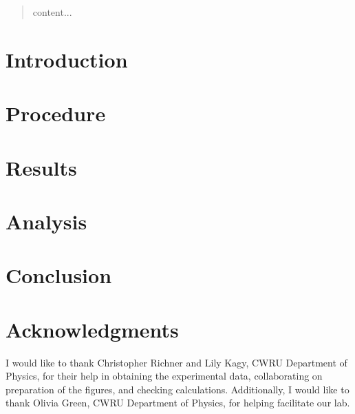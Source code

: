 \documentclass[coverpage]{article}
\begin{document}
	
	
	\begin{abstract}
		content...
	\end{abstract}
	
	\tableofcontents
	
	\section{Introduction}
	
	\section{Procedure}
	
	\section{Results}
	
	\section{Analysis}
	
	\section{Conclusion}
	
	\section*{Acknowledgments}
	I would like to thank Christopher Richner and Lily Kagy, CWRU Department of Physics, for their help in obtaining the experimental data, collaborating on preparation of the figures, and checking calculations. Additionally, I would like to thank Olivia Green, CWRU Department of Physics, for helping facilitate our lab.
	
	
	\nocite{textbook}
	\nocite{labManual}
	
\end{document}
